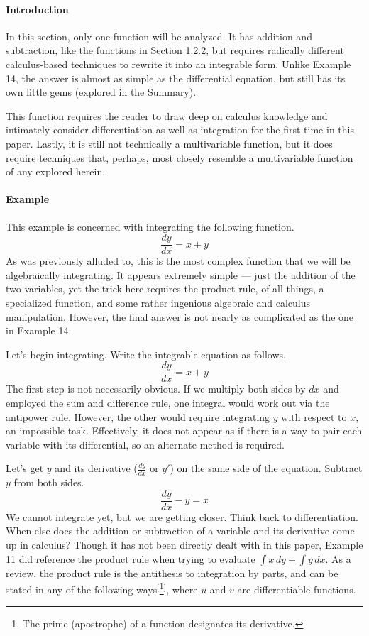 \documentclass{article}
\newcounter{example}%
\newcommand{\ex}{\stepcounter{example} \paragraph{Example \theexample}}
\begin{document}
\paragraph{Introduction} In this section, only one function will be analyzed. It has addition and subtraction, like the functions in Section 1.2.2, but requires radically different calculus-based techniques to rewrite it into an integrable form. Unlike Example 14, the answer is almost as simple as the differential equation, but still has its own little gems (explored in the Summary).\par
This function requires the reader to draw deep on calculus knowledge and intimately consider differentiation as well as integration for the first time in this paper. Lastly, it is still not technically a multivariable function, but it does require techniques that, perhaps, most closely resemble a multivariable function of any explored herein.
\ex This example is concerned with integrating the following function.$$\frac{dy}{dx}=x+y$$
As was previously alluded to, this is the most complex function that we will be algebraically integrating. It appears extremely simple --- just the addition of the two variables, yet the trick here requires the product rule, of all things, a specialized function, and some rather ingenious algebraic and calculus manipulation. However, the final answer is not nearly as complicated as the one in Example 14.\par
Let's begin integrating. Write the integrable equation as follows.
\begin{equation*}
    \frac{dy}{dx}=x+y
\end{equation*}
The first step is not necessarily obvious. If we multiply both sides by $dx$ and employed the sum and difference rule, one integral would work out via the antipower rule. However, the other would require integrating $y$ with respect to $x$, an impossible task. Effectively, it does not appear as if there is a way to pair each variable with its differential, so an alternate method is required.\par
Let's get $y$ and its derivative ($\frac{dy}{dx}$ or $y'$) on the same side of the equation. Subtract $y$ from both sides.
\begin{equation*}
    \frac{dy}{dx}-y=x
\end{equation*}
We cannot integrate yet, but we are getting closer. Think back to differentiation. When else does the addition or subtraction of a variable and its derivative come up in calculus? Though it has not been directly dealt with in this paper, Example 11 did reference the product rule when trying to evaluate $\int x\, dy + \int y\, dx$. As a review, the product rule is the antithesis to integration by parts, and can be stated in any of the following ways$^[$\footnote{The prime (apostrophe) of a function designates its derivative.}$^]$, where $u$ and $v$ are differentiable functions.
\end{document}
